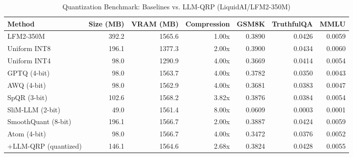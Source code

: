 \begin{table}[htbp]
  \centering
  \small
  \caption{Quantization Benchmark: Baselines vs. LLM-QRP (LiquidAI/LFM2-350M)}
  \label{tab:benchmark}
  \begin{tabular}{lrrrrrr}
    \toprule
    \textbf{Method} & \textbf{Size (MB)} & \textbf{VRAM (MB)} & \textbf{Compression} & \textbf{GSM8K} & \textbf{TruthfulQA} & \textbf{MMLU} \\
    \midrule
    LFM2-350M & 392.2 & 1565.6 & 1.00x & 0.3890 & 0.0426 & 0.0059 \\
    Uniform INT8 & 196.1 & 1377.3 & 2.00x & 0.3900 & 0.0434 & 0.0060 \\
    Uniform INT4 & 98.0 & 1290.9 & 4.00x & 0.3669 & 0.0414 & 0.0054 \\
    GPTQ (4-bit) & 98.0 & 1563.7 & 4.00x & 0.3782 & 0.0350 & 0.0043 \\
    AWQ (4-bit) & 98.0 & 1562.9 & 4.00x & 0.3681 & 0.0383 & 0.0047 \\
    SpQR (3-bit) & 102.6 & 1568.2 & 3.82x & 0.3876 & 0.0384 & 0.0054 \\
    SliM-LLM (2-bit) & 49.0 & 1561.4 & 8.00x & 0.0609 & 0.0003 & 0.0001 \\
    SmoothQuant (8-bit) & 196.1 & 1566.7 & 2.00x & 0.3887 & 0.0424 & 0.0059 \\
    Atom (4-bit) & 98.0 & 1566.7 & 4.00x & 0.3472 & 0.0376 & 0.0052 \\
    \midrule
    +LLM-QRP (quantized) & 146.1 & 1564.6 & 2.68x & 0.3824 & 0.0428 & 0.0055 \\
    \bottomrule
  \end{tabular}
\end{table}
